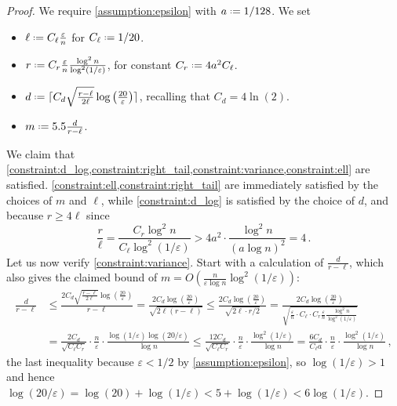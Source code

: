 \documentclass[10pt,a4paper]{article}
\newcommand*{\define}{\mathrel{\vcenter{\baselineskip0.5ex \lineskiplimit0pt
                      \hbox{\scriptsize.}\hbox{\scriptsize.}}}%
                      =}
\newcommand{\ceil}[1]{\ensuremath{\lceil #1 \rceil}}
\renewcommand{\epsilon}{\varepsilon}
\begin{document}
\begin{proof}
    We require \cref{assumption:epsilon} with $a \define 1/128$. We set
    \begin{itemize}
        \item $\ell \define C_\ell \frac{\epsilon}{n}$ for $C_\ell \define 1/20$.
        \item $r \define C_r \frac{\epsilon}{n} \frac{\log^2 n}{\log^2(1/\epsilon)}$, for constant
            $C_r \define 4 a^2 C_\ell$.
        \item $d \define \ceil{C_d \sqrt{\frac{r-\ell}{2\ell}} \log \left(\frac{20}{\epsilon}
            \right)}$, recalling that $C_d = 4\ln(2)$.
        \item $m \define 5.5 \frac{d}{r-\ell}$.
    \end{itemize}
    We claim that \cref{constraint:d_log,constraint:right_tail,constraint:variance,constraint:ell}
    are satisfied. \cref{constraint:ell,constraint:right_tail} are immediately satisfied by the
    choices of $m$ and $\ell$, while \cref{constraint:d_log} is satisfied by the choice of $d$, and
    because $r \ge 4\ell$ since
    \[
        \frac{r}{\ell} = \frac{C_r \log^2 n}{C_\ell \log^2(1/\epsilon)}
        > 4 a^2 \cdot \frac{\log^2 n}{(a \log n)^2}
        = 4 \,.
    \]
    Let us now verify \cref{constraint:variance}. Start with a calculation of
$\tfrac{d}{r-\ell}$, which also gives the claimed bound of $m = O(\tfrac{n}{\epsilon \log
n}\log^2(1/\epsilon))$:
    \begin{align*}
        \frac{d}{r-\ell}
        &\le \frac{2C_d \sqrt{\frac{r-\ell}{2\ell}} \log \left(\frac{20}{\epsilon} \right)}{r-\ell}
        = \frac{2C_d \log \left(\frac{20}{\epsilon} \right)}{\sqrt{2\ell(r-\ell)}}
        \le \frac{2C_d \log \left(\frac{20}{\epsilon} \right)}{\sqrt{2\ell \cdot r/2}}
        = \frac{2C_d \log \left(\frac{20}{\epsilon} \right)}{
            \sqrt{\frac{\epsilon}{n} \cdot C_\ell \cdot
                C_r \frac{\epsilon}{n} \frac{\log^2 n}{\log^2(1/\epsilon)}}} \\
        &= \frac{2C_d}{\sqrt{C_\ell C_r}} \cdot \frac{n}{\epsilon} \cdot \frac{\log(1/\epsilon) \log(20/\epsilon)}{\log n} 
        \leq \frac{12 C_d}{\sqrt{C_\ell C_r}} \cdot \frac{n}{\epsilon} \cdot \frac{\log^2(1/\epsilon)}{\log n} 
        = \frac{6 C_d}{C_\ell a} \cdot \frac{n}{\epsilon} \cdot \frac{\log^2(1/\epsilon)}{\log n} \,,
    \end{align*}
    the last inequality because $\epsilon < 1/2$ by \cref{assumption:epsilon}, so $\log(1/\epsilon)
    > 1$ and hence $\log(20/\epsilon) = \log(20) + \log(1/\epsilon) < 5 + \log(1/\epsilon) <
    6\log(1/\epsilon)$.


\end{proof}
\end{document}

